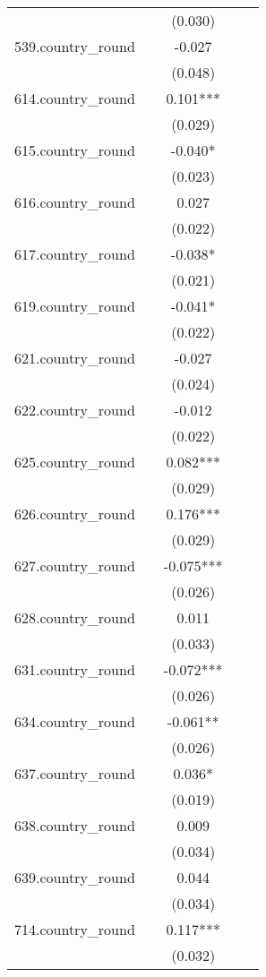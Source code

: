 \documentclass[]{article}
\begin{document}
\begin{tabular}{lcccc}
 &  & (0.030) &  &  \\
539.country\_round &  & -0.027 &  &  \\
 &  & (0.048) &  &  \\
614.country\_round &  & 0.101*** &  &  \\
 &  & (0.029) &  &  \\
615.country\_round &  & -0.040* &  &  \\
 &  & (0.023) &  &  \\
616.country\_round &  & 0.027 &  &  \\
 &  & (0.022) &  &  \\
617.country\_round &  & -0.038* &  &  \\
 &  & (0.021) &  &  \\
619.country\_round &  & -0.041* &  &  \\
 &  & (0.022) &  &  \\
621.country\_round &  & -0.027 &  &  \\
 &  & (0.024) &  &  \\
622.country\_round &  & -0.012 &  &  \\
 &  & (0.022) &  &  \\
625.country\_round &  & 0.082*** &  &  \\
 &  & (0.029) &  &  \\
626.country\_round &  & 0.176*** &  &  \\
 &  & (0.029) &  &  \\
627.country\_round &  & -0.075*** &  &  \\
 &  & (0.026) &  &  \\
628.country\_round &  & 0.011 &  &  \\
 &  & (0.033) &  &  \\
631.country\_round &  & -0.072*** &  &  \\
 &  & (0.026) &  &  \\
634.country\_round &  & -0.061** &  &  \\
 &  & (0.026) &  &  \\
637.country\_round &  & 0.036* &  &  \\
 &  & (0.019) &  &  \\
638.country\_round &  & 0.009 &  &  \\
 &  & (0.034) &  &  \\
639.country\_round &  & 0.044 &  &  \\
 &  & (0.034) &  &  \\
714.country\_round &  & 0.117*** &  &  \\
 &  & (0.032) &  &  \\

\end{tabular}
\end{document}
